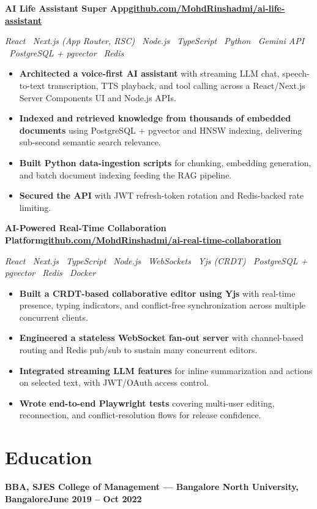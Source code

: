\documentclass[a4paper,10pt]{article}
\newcommand{\entry}[2]{%
  \noindent\textbf{#1}\hfill\textbf{#2}\par
}
\newcommand{\stack}[1]{%
  {\small\itshape\color{black!72}#1}\par
}
\begin{document}
\filbreak
\entry{AI Life Assistant Super App}{\normalfont\footnotesize\color{black!72}\href{https://github.com/MohdRinshadmi/ai-life-assistant}{github.com/MohdRinshadmi/ai-life-assistant}}
\stack{React \textbullet\ Next.js (App Router, RSC) \textbullet\ Node.js \textbullet\ TypeScript \textbullet\ Python \textbullet\ Gemini API \textbullet\ PostgreSQL + pgvector \textbullet\ Redis}
\begin{itemize}
  \item \textbf{Architected a voice-first AI assistant} with streaming LLM chat, speech-to-text transcription, TTS playback, and tool calling across a React/Next.js Server Components UI and Node.js APIs.
  \item \textbf{Indexed and retrieved knowledge from thousands of embedded documents} using PostgreSQL + pgvector and HNSW indexing, delivering sub-second semantic search relevance.
  \item \textbf{Built Python data-ingestion scripts} for chunking, embedding generation, and batch document indexing feeding the RAG pipeline.
  \item \textbf{Secured the API} with JWT refresh-token rotation and Redis-backed rate limiting.
\end{itemize}

\filbreak
\entry{AI-Powered Real-Time Collaboration Platform}{\normalfont\footnotesize\color{black!72}\href{https://github.com/MohdRinshadmi/ai-real-time-collaboration}{github.com/MohdRinshadmi/ai-real-time-collaboration}}
\stack{React \textbullet\ Next.js \textbullet\ TypeScript \textbullet\ Node.js \textbullet\ WebSockets \textbullet\ Yjs (CRDT) \textbullet\ PostgreSQL + pgvector \textbullet\ Redis \textbullet\ Docker}
\begin{itemize}
  \item \textbf{Built a CRDT-based collaborative editor using Yjs} with real-time presence, typing indicators, and conflict-free synchronization across multiple concurrent clients.
  \item \textbf{Engineered a stateless WebSocket fan-out server} with channel-based routing and Redis pub/sub to sustain many concurrent editors.
  \item \textbf{Integrated streaming LLM features} for inline summarization and actions on selected text, with JWT/OAuth access control.
  \item \textbf{Wrote end-to-end Playwright tests} covering multi-user editing, reconnection, and conflict-resolution flows for release confidence.
\end{itemize}

\section{Education}
\entry{BBA, SJES College of Management --- Bangalore North University, Bangalore}{June 2019 -- Oct 2022}
\end{document}
